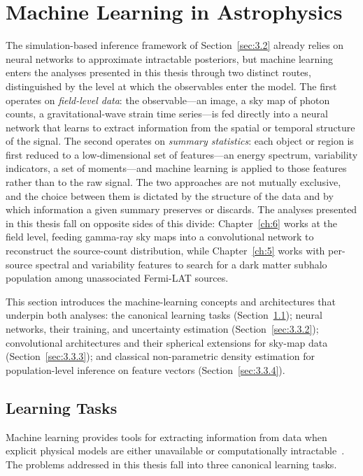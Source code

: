 \section{Machine Learning in Astrophysics}
\label{sec:3.3}
The simulation-based inference framework of Section~\ref{sec:3.2} already relies on neural networks to approximate intractable posteriors, but machine learning enters the analyses presented in this thesis through two distinct routes, distinguished by the level at which the observables enter the model.
The first operates on \emph{field-level data}: the observable---an image, a sky map of photon counts, a gravitational-wave strain time series---is fed directly into a neural network that learns to extract information from the spatial or temporal structure of the signal.
The second operates on \emph{summary statistics}: each object or region is first reduced to a low-dimensional set of features---an energy spectrum, variability indicators, a set of moments---and machine learning is applied to those features rather than to the raw signal.
The two approaches are not mutually exclusive, and the choice between them is dictated by the structure of the data and by which information a given summary preserves or discards.
The analyses presented in this thesis fall on opposite sides of this divide: Chapter~\ref{ch:6} works at the field level, feeding gamma-ray sky maps into a convolutional network to reconstruct the source-count distribution, while Chapter~\ref{ch:5} works with per-source spectral and variability features to search for a dark matter subhalo population among unassociated Fermi-LAT sources.

This section introduces the machine-learning concepts and architectures that underpin both analyses: the canonical learning tasks (Section~\ref{sec:3.3.1}); neural networks, their training, and uncertainty estimation (Section~\ref{sec:3.3.2}); convolutional architectures and their spherical extensions for sky-map data (Section~\ref{sec:3.3.3}); and classical non-parametric density estimation for population-level inference on feature vectors (Section~\ref{sec:3.3.4}).

\subsection{Learning Tasks}
\label{sec:3.3.1}

Machine learning provides tools for extracting information from data when explicit physical models are either unavailable or computationally intractable~\cite{bishop,Hastie:2009}.
The problems addressed in this thesis fall into three canonical learning tasks.


